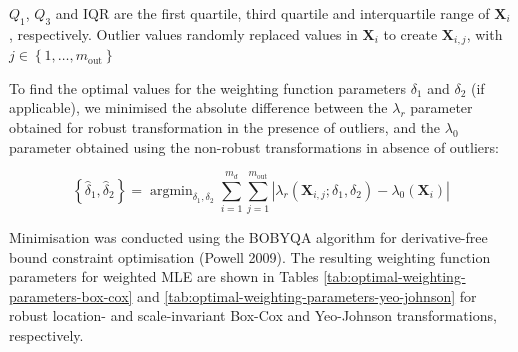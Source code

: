 \documentclass[preprint,12pt,authoryear]{elsarticle}
\DeclareMathOperator*{\argmin}{argmin}
\begin{document}
\(Q_1\), \(Q_3\) and \(\text{IQR}\) are the first quartile, third
quartile and interquartile range of \(\mathbf{X}_i\), respectively.
Outlier values randomly replaced values in \(\mathbf{X}_i\) to create
\(\mathbf{X}_{i,j}\), with
\(j \in \left\{ 1, \ldots, m_{\text{out}} \right\}\)

To find the optimal values for the weighting function parameters
\(\delta_1\) and \(\delta_2\) (if applicable), we minimised the absolute
difference between the \(\lambda_{r}\) parameter obtained for robust
transformation in the presence of outliers, and the \(\lambda_0\)
parameter obtained using the non-robust transformations in absence of
outliers:

\begin{equation}
\label{eqn:minimisation-weighting}
\left\{ \hat{\delta}_1, \hat{\delta}_2 \right\} = \argmin_{\delta_1, \delta_2} \sum_{i=1}^{m_d} \sum_{j=1}^{m_{\text{out}}} \left| \lambda_r \left(\mathbf{X}_{i, j}; \delta_1, \delta_2 \right) - \lambda_0 \left(\mathbf{X}_i \right) \right|
\end{equation}

Minimisation was conducted using the BOBYQA algorithm for
derivative-free bound constraint optimisation (Powell 2009). The
resulting weighting function parameters for weighted MLE are shown in
Tables \ref{tab:optimal-weighting-parameters-box-cox} and
\ref{tab:optimal-weighting-parameters-yeo-johnson} for robust location-
and scale-invariant Box-Cox and Yeo-Johnson transformations,
respectively.
\end{document}
